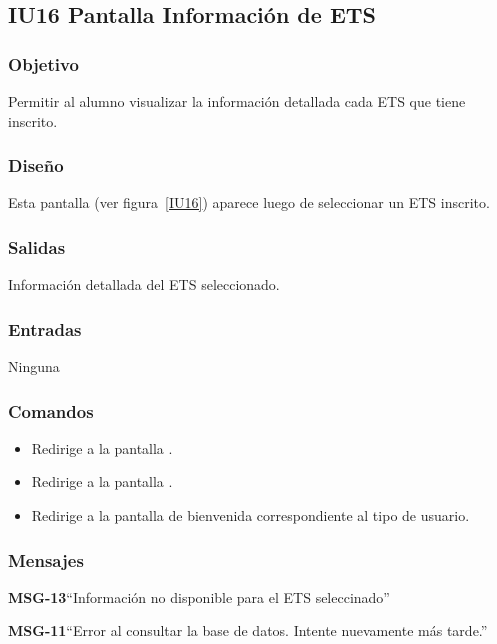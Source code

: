 \subsection{IU16 Pantalla Información de ETS}

\subsubsection{Objetivo}
Permitir al alumno visualizar la información detallada cada ETS que tiene inscrito.

\subsubsection{Diseño}
Esta pantalla  (ver figura~\ref{IU16}) aparece luego de seleccionar un ETS inscrito. 


\subsubsection{Salidas}

Información detallada del ETS seleccionado. 

\subsubsection{Entradas}
Ninguna


\subsubsection{Comandos}
\begin{itemize}
	\item {} Redirige a la pantalla .
    \item {} Redirige a la pantalla .
    \item {} Redirige a la pantalla de bienvenida correspondiente al tipo de usuario.
\end{itemize}

\subsubsection{Mensajes}

\begin{Citemize}
	\item {\bf MSG-13}{``Información no disponible para el ETS seleccinado''}
	\item {\bf MSG-11}{``Error al consultar la base de datos. Intente nuevamente más tarde.''}
\end{Citemize}



